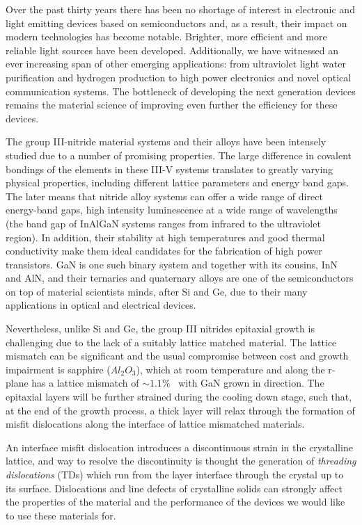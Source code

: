 Over the past thirty years there has been no shortage of interest in electronic and light emitting devices based on semiconductors and, as a result, their impact on modern technologies has become notable. Brighter, more efficient and more reliable light sources have been developed. Additionally, we have witnessed an ever increasing  span of other emerging applications: from ultraviolet light water purification and hydrogen production to high power electronics and novel optical communication systems. The bottleneck of developing the next generation devices remains the material science of improving even further the efficiency for these devices.

The group III-nitride material systems and their alloys have been intensely studied due to a number of promising properties. The large difference in covalent bondings of the elements in these III-V systems translates to greatly varying physical properties, including different lattice parameters and energy band gaps. The later means that nitride alloy systems can offer a wide range of direct energy-band gaps, \ie high intensity luminescence at a wide range of wavelengths (\eg the band gap of InAlGaN systems ranges from infrared to the ultraviolet region).  In addition, their stability at high temperatures and good thermal conductivity make them ideal candidates for the fabrication of high power transistors. GaN is one such binary system and together with its cousins, InN and AlN, and their ternaries and quaternary alloys are one of the semiconductors on top of material scientists minds, after Si and Ge, due to their many applications in optical and electrical devices.  

Nevertheless, unlike Si and Ge, the group III nitrides epitaxial growth is challenging due to the lack of a suitably lattice matched material. The lattice mismatch can be significant and the usual compromise between cost and growth impairment is sapphire ($Al_2O_3$), which at room temperature and along the r-plane has a lattice mismatch of $\sim1.1\%$~\cite{nitrides} with GaN grown in \hkl[0001] direction. The epitaxial layers will be further strained during the cooling down stage, such that, at the end of the growth process, a thick layer will relax through the formation of misfit dislocations along the interface of lattice mismatched materials.

An interface misfit dislocation introduces a discontinuous strain in the crystalline lattice, and way to resolve the discontinuity is thought the generation of \textit{threading dislocations} (TDs) which run from the layer interface through the crystal up to its surface. Dislocations and line defects of crystalline solids can strongly affect the properties of the material and the performance of the devices we would like to use these materials for.

